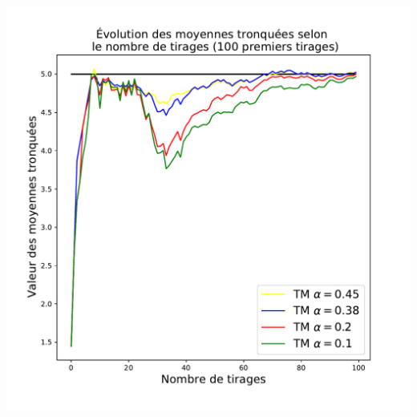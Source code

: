 \documentclass[8pt,sans,aspectratio=169]{beamer}
\begin{document}
\begin{frame}
\begin{columns}[T]
\begin{column}{0.5\linewidth}
\includegraphics[scale=0.3]{mt-100.pdf}

\end{column}

\end{columns}

\vfill


\end{frame}
\end{document}
